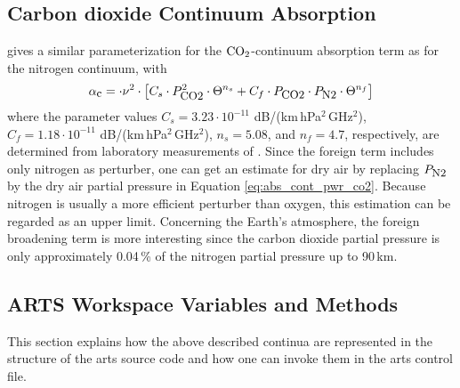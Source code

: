 \subsection{Carbon dioxide Continuum Absorption}
\label{levelc:co2cont}
\citet{pwr:93} gives a similar parameterization for the $\mbox{CO}_2$-continuum 
absorption term as for the nitrogen continuum, with 
\begin{equation}
  \label{eq:abs_cont_pwr_co2}
    \alpha_{\mbox{\small c}} =   \cdot \nu^2 \cdot  
                \left[ C_s \cdot P_{\mbox{\rm \small CO2}}^2           \cdot \Theta^{n_s} +
                       C_f \cdot P_{\mbox{\rm \small CO2}}  \cdot P_{\mbox{\rm \small N2}} \cdot \Theta^{n_f} \right]
\end{equation}
where the parameter values $C_s = 3.23\cdot 10^{-11}$
dB/(km\,hPa$^2$\,GHz$^2$), $C_f = 1.18\cdot 10^{-11}$
dB/(km\,hPa$^2$\,GHz$^2$), $n_s=5.08$, and $n_f=4.7$, respectively, 
are determined from laboratory measurements of \citet{ho:66,dagg:75}. 
Since the foreign term
includes only nitrogen as perturber, one can get an estimate for dry
air by replacing $P_{\mbox{\rm \small N2}}$ by the dry air partial pressure in
Equation \ref{eq:abs_cont_pwr_co2}. Because nitrogen is usually a more
efficient perturber than oxygen, this estimation can be regarded as an
upper limit. Concerning the Earth's atmosphere, the foreign broadening
term is more interesting since the carbon dioxide partial pressure is
only approximately 0.04\,\% of the nitrogen partial pressure up to
90\,km.




\subsection{ARTS Workspace Variables and Methods}
\label{levelc:ArtsImplementationContinuum}

This section explains how the above described continua are represented 
in the structure of the arts source code and how one can invoke them in 
the arts control file.

